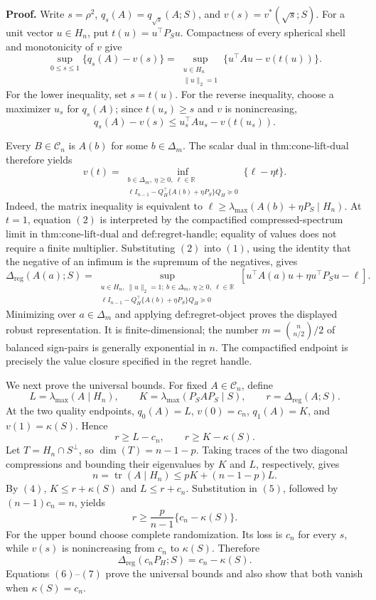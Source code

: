 \textbf{Proof.}
Write \(s=\rho^2\), \(q_s(A)=q_{\sqrt{s}}(A;S)\), and \(v(s)=v^*(\sqrt{s};S)\).  For a unit vector \(u\in H_n\), put \(t(u)=u^\top P_Su\).  Compactness of every spherical shell and monotonicity of \(v\) give
\[
\sup_{0\leq s\leq1}\{q_s(A)-v(s)\}
=\sup_{\substack{u\in H_n\\\|u\|_2=1}}
\{u^\top Au-v(t(u))\}.
\tag{1}
\]
For the lower inequality, set \(s=t(u)\).  For the reverse inequality, choose a maximizer \(u_s\) for \(q_s(A)\); since \(t(u_s)\geq s\) and \(v\) is nonincreasing,
\[
q_s(A)-v(s)\leq u_s^\top Au_s-v(t(u_s)).
\]

Every \(B\in\mathcal C_n\) is \(A(b)\) for some \(b\in\Delta_m\).  The scalar dual in \(\text{thm:cone-lift-dual}\) therefore yields
\[
v(t)=
\inf_{\substack{b\in\Delta_m,\ \eta\geq0,\ \ell\in\mathbb R\\
\ell I_{n-1}-Q_H^\top\{A(b)+\eta P_S\}Q_H\succeq0}}
\{\ell-\eta t\}.
\tag{2}
\]
Indeed, the matrix inequality is equivalent to \(\ell\geq\lambda_{\max}(A(b)+\eta P_S\mid H_n)\).  At \(t=1\), equation \((2)\) is interpreted by the compactified compressed-spectrum limit in \(\text{thm:cone-lift-dual}\) and \(\text{def:regret-handle}\); equality of values does not require a finite multiplier.  Substituting \((2)\) into \((1)\), using the identity that the negative of an infimum is the supremum of the negatives, gives
\[
\Delta_{\mathrm{reg}}(A(a);S)
=\sup_{\substack{u\in H_n,\ \|u\|_2=1;\ b\in\Delta_m,\ \eta\geq0,\ \ell\in\mathbb R\\
\ell I_{n-1}-Q_H^\top\{A(b)+\eta P_S\}Q_H\succeq0}}
\left[u^\top A(a)u+\eta u^\top P_Su-\ell\right].
\tag{3}
\]
Minimizing over \(a\in\Delta_m\) and applying \(\text{def:regret-object}\) proves the displayed robust representation.  It is finite-dimensional; the number \(m=\binom{n}{n/2}/2\) of balanced sign-pairs is generally exponential in \(n\).  The compactified endpoint is precisely the value closure specified in the regret handle.

We next prove the universal bounds.  For fixed \(A\in\mathcal C_n\), define
\[
L=\lambda_{\max}(A\mid H_n),
\qquad
K=\lambda_{\max}(P_SAP_S\mid S),
\qquad
r=\Delta_{\mathrm{reg}}(A;S).
\]
At the two quality endpoints, \(q_0(A)=L\), \(v(0)=c_n\), \(q_1(A)=K\), and \(v(1)=\kappa(S)\).  Hence
\[
r\geq L-c_n,
\qquad
r\geq K-\kappa(S).
\tag{4}
\]
Let \(T=H_n\cap S^\perp\), so \(\dim(T)=n-1-p\).  Taking traces of the two diagonal compressions and bounding their eigenvalues by \(K\) and \(L\), respectively, gives
\[
n=\operatorname{tr}(A\mid H_n)
\leq pK+(n-1-p)L.
\tag{5}
\]
By \((4)\), \(K\leq r+\kappa(S)\) and \(L\leq r+c_n\).  Substitution in \((5)\), followed by \((n-1)c_n=n\), yields
\[
r\geq\frac{p}{n-1}\{c_n-\kappa(S)\}.
\tag{6}
\]
For the upper bound choose complete randomization.  Its loss is \(c_n\) for every \(s\), while \(v(s)\) is nonincreasing from \(c_n\) to \(\kappa(S)\).  Therefore
\[
\Delta_{\mathrm{reg}}(c_nP_H;S)=c_n-\kappa(S).
\tag{7}
\]
Equations \((6)\)--\((7)\) prove the universal bounds and also show that both vanish when \(\kappa(S)=c_n\).

